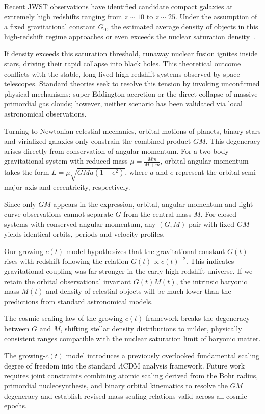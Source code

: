 \documentclass[12pt,leqno]{article}
\begin{document}
{	\medskip
	Recent JWST observations have identified candidate compact galaxies at extremely high redshifts ranging from $z\sim10$ to $z\sim25$. Under the assumption of a fixed gravitational constant $G_0$, the estimated average density of objects in this high-redshift regime approaches or even exceeds the nuclear saturation density~\cite{Labbe:2023}.
	
	\medskip
	If density exceeds this saturation threshold, runaway nuclear fusion ignites inside stars, driving their rapid collapse into black holes. This theoretical outcome conflicts with the stable, long-lived high-redshift systems observed by space telescopes. Standard theories seek to resolve this tension by invoking unconfirmed physical mechanisms: super-Eddington accretion or the direct collapse of massive primordial gas clouds; however, neither scenario has been validated via local astronomical observations.
	
	\medskip
	Turning to Newtonian celestial mechanics, orbital motions of planets, binary stars and virialized galaxies only constrain the combined product $GM$. This degeneracy arises directly from conservation of angular momentum. For a two-body gravitational system with reduced mass $\mu=\frac{Mm}{M+m}$, orbital angular momentum takes the form $L=\mu\sqrt{G M a(1-e^2)}$, where $a$ and $e$ represent the orbital semi-major axis and eccentricity, respectively.
	
	\medskip
	Since only $GM$ appears in the expression, orbital, angular-momentum and light-curve observations cannot separate $G$ from the central mass $M$. For closed systems with conserved angular momentum, any $(G,M)$ pair with fixed $GM$ yields identical orbits, periods and velocity profiles.
	
	\medskip
	Our growing-$c(t)$ model hypothesizes that the gravitational constant $G(t)$ rises with redshift following the relation $G(t)\propto c(t)^{-2}$. This indicates gravitational coupling was far stronger in the early high-redshift universe. If we retain the orbital observational invariant $G(t)M(t)$, the intrinsic baryonic mass $M(t)$ and density of celestial objects will be much lower than the predictions from standard astronomical models. 
	
	\medskip
	The cosmic scaling law of the growing-$c(t)$ framework breaks the degeneracy between $G$ and $M$, shifting stellar density distributions to milder, physically consistent ranges compatible with the nuclear saturation limit of baryonic matter.
	
	\medskip
	The growing-$c(t)$ model introduces a previously overlooked fundamental scaling degree of freedom into the standard $\Lambda$CDM analysis framework. Future work requires joint constraints combining atomic scaling derived from the Bohr radius, primordial nucleosynthesis, and binary orbital kinematics to resolve the $GM$ degeneracy and establish revised mass scaling relations valid across all cosmic epochs.
	
}
\end{document}
